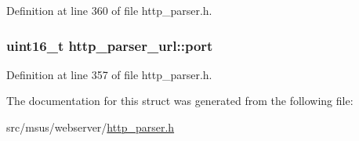 Definition at line 360 of file http\-\_\-parser.\-h.

\hypertarget{structhttp__parser__url_a875fb8faf3ee45707078eda5435fa563}{
\subsubsection[{port}]{\setlength{\rightskip}{0pt plus 5cm}uint16\-\_\-t http\-\_\-parser\-\_\-url\-::port}}\label{structhttp__parser__url_a875fb8faf3ee45707078eda5435fa563}


Definition at line 357 of file http\-\_\-parser.\-h.



The documentation for this struct was generated from the following file\-:\begin{DoxyCompactItemize}
\item 
src/msus/webserver/\hyperlink{http__parser_8h}{http\-\_\-parser.\-h}\end{DoxyCompactItemize}
